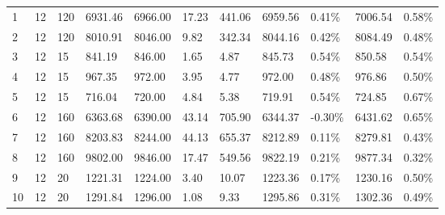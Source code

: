 \documentclass[../main]{subfiles}
\begin{document}
\begin{longtable}{l|ll|lll|lllll}
   1                   & 12                              & 120                    & 6931.46             & 6966.00  & 17.23         & 441.06                     & \cellcolor{green!25}6959.56 & 0.41\%  & 7006.54 & 0.58\% \\
   2                   & 12                              & 120                    & 8010.91             & 8046.00  & 9.82          & 342.34                     & \cellcolor{green!25}8044.16 & 0.42\%  & 8084.49 & 0.48\% \\
   3                   & 12                              & 15                     & 841.19              & 846.00   & 1.65          & 4.87                       & \cellcolor{green!25}845.73  & 0.54\%  & 850.58  & 0.54\% \\
   4                   & 12                              & 15                     & 967.35              & 972.00   & 3.95          & 4.77                       & \cellcolor{green!25}972.00  & 0.48\%  & 976.86  & 0.50\% \\
   5                   & 12                              & 15                     & 716.04              & 720.00   & 4.84          & 5.38                       & \cellcolor{green!25}719.91  & 0.54\%  & 724.85  & 0.67\% \\
   6                   & 12                              & 160                    & 6363.68             & 6390.00  & 43.14         & 705.90                     & 6344.37                     & -0.30\% & 6431.62 & 0.65\% \\
   7                   & 12                              & 160                    & 8203.83             & 8244.00  & 44.13         & 655.37                     & \cellcolor{green!25}8212.89 & 0.11\%  & 8279.81 & 0.43\% \\
   8                   & 12                              & 160                    & 9802.00             & 9846.00  & 17.47         & 549.56                     & \cellcolor{green!25}9822.19 & 0.21\%  & 9877.34 & 0.32\% \\
   9                   & 12                              & 20                     & 1221.31             & 1224.00  & 3.40          & 10.07                      & \cellcolor{green!25}1223.36 & 0.17\%  & 1230.16 & 0.50\% \\
   10                  & 12                              & 20                     & 1291.84             & 1296.00  & 1.08          & 9.33                       & \cellcolor{green!25}1295.86 & 0.31\%  & 1302.36 & 0.49\% \\

\end{longtable}
\end{document}
